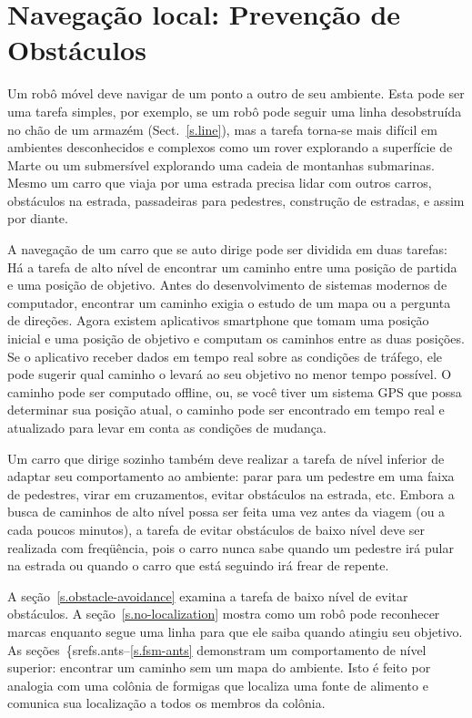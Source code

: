 
\chapter{Navegação local: Prevenção de Obstáculos}\label{ch.obstacle}

Um robô móvel deve {navigar} de um ponto a outro de seu ambiente. Esta pode ser uma tarefa simples, por exemplo, se um robô pode seguir uma linha desobstruída no chão de um armazém (Sect.~\ref{s.line}), mas a tarefa torna-se mais difícil em ambientes desconhecidos e complexos como um rover explorando a superfície de Marte ou um submersível explorando uma cadeia de montanhas submarinas. Mesmo um carro que viaja por uma estrada precisa lidar com outros carros, obstáculos na estrada, passadeiras para pedestres, construção de estradas, e assim por diante. 

A navegação de um carro que se auto dirige pode ser dividida em duas tarefas: Há a tarefa de alto nível de encontrar um caminho entre uma posição de partida e uma posição de objetivo. Antes do desenvolvimento de sistemas modernos de computador, encontrar um caminho exigia o estudo de um mapa ou a pergunta de direções. Agora existem aplicativos smartphone que tomam uma posição inicial e uma posição de objetivo e computam os caminhos entre as duas posições. Se o aplicativo receber dados em tempo real sobre as condições de tráfego, ele pode sugerir qual caminho o levará ao seu objetivo no menor tempo possível. O caminho pode ser computado offline, ou, se você tiver um sistema GPS que possa determinar sua posição atual, o caminho pode ser encontrado em tempo real e atualizado para levar em conta as condições de mudança.

Um carro que dirige sozinho também deve realizar a tarefa de nível inferior de adaptar seu comportamento ao ambiente: parar para um pedestre em uma faixa de pedestres, virar em cruzamentos, evitar obstáculos na estrada, etc. Embora a busca de caminhos de alto nível possa ser feita uma vez antes da viagem (ou a cada poucos minutos), a tarefa de evitar obstáculos de baixo nível deve ser realizada com freqüência, pois o carro nunca sabe quando um pedestre irá pular na estrada ou quando o carro que está seguindo irá frear de repente.

A seção~\ref{s.obstacle-avoidance} examina a tarefa de baixo nível de evitar obstáculos. A seção~\ref{s.no-localization} mostra como um robô pode reconhecer marcas enquanto segue uma linha para que ele saiba quando atingiu seu objetivo. As seções~\{sref{s.ants}--\ref{s.fsm-ants} demonstram um comportamento de nível superior: encontrar um caminho sem um mapa do ambiente. Isto é feito por analogia com uma colônia de formigas que localiza uma fonte de alimento e comunica sua localização a todos os membros da colônia.

